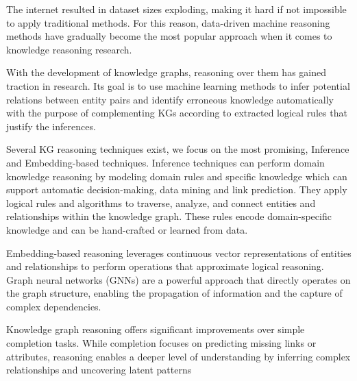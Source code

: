 The internet resulted in dataset sizes exploding, making it hard if not impossible to apply traditional methods. For this reason, data-driven machine reasoning methods have gradually become the most popular approach when it comes to knowledge reasoning research.

With the development of knowledge graphs, reasoning over them has gained traction in research. Its goal is to use machine learning methods to infer potential relations between entity pairs and identify erroneous knowledge automatically with the purpose of complementing KGs according to extracted logical rules that justify the inferences.




Several KG reasoning techniques exist, we focus on the most promising, Inference and Embedding-based techniques. Inference techniques can perform domain knowledge reasoning by modeling domain rules and specific knowledge which can support automatic decision-making, data mining and link prediction. They apply logical rules and algorithms to traverse, analyze, and connect entities and relationships within the knowledge graph. These rules encode domain-specific knowledge and can be hand-crafted or learned from data.

Embedding-based reasoning leverages continuous vector representations of entities and relationships to perform operations that approximate logical reasoning. Graph neural networks (GNNs) \cite{sola2023deep} are a powerful approach that directly operates on the graph structure, enabling the propagation of information and the capture of complex dependencies.

Knowledge graph reasoning offers significant improvements over simple completion tasks. While completion focuses on predicting missing links or attributes, reasoning enables a deeper level of understanding by inferring complex relationships and uncovering latent patterns




